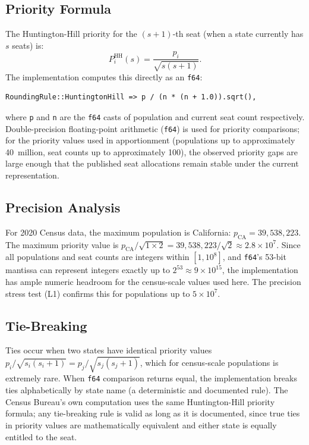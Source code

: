 \label{sec:huntington-hill}

\subsection{Priority Formula}

The Huntington-Hill priority for the $(s+1)$-th seat (when a state
currently has $s$ seats) is:
\[
  P_i^{\text{HH}}(s) = \frac{p_i}{\sqrt{s(s+1)}}.
\]
The implementation computes this directly as an \texttt{f64}:

\begin{verbatim}
RoundingRule::HuntingtonHill => p / (n * (n + 1.0)).sqrt(),
\end{verbatim}

where \texttt{p} and \texttt{n} are the \texttt{f64} casts of population
and current seat count respectively.
Double-precision floating-point arithmetic (\texttt{f64}) is used for
priority comparisons; for the priority values used in apportionment
(populations up to approximately 40~million, seat counts up to
approximately 100), the observed priority gaps are large enough that the
published seat allocations remain stable under the current representation.

\subsection{Precision Analysis}

For 2020 Census data, the maximum population is California:
$p_{\text{CA}} = 39{,}538{,}223$.
The maximum priority value is $p_{\text{CA}} / \sqrt{1 \times 2}
= 39{,}538{,}223 / \sqrt{2} \approx 2.8 \times 10^7$.
Since all populations and seat counts are integers within $[1, 10^8]$,
and \texttt{f64}'s 53-bit mantissa can represent integers exactly up to
$2^{53} \approx 9 \times 10^{15}$, the implementation has ample numeric
headroom for the census-scale values used here.
The precision stress test (L1) confirms this for populations up to
$5 \times 10^7$.

\subsection{Tie-Breaking}

Ties occur when two states have identical priority values $p_i / \sqrt{s_i(s_i+1)}
= p_j / \sqrt{s_j(s_j+1)}$, which for census-scale populations is
extremely rare.
When \texttt{f64} comparison returns equal, the implementation breaks
ties alphabetically by state name (a deterministic and documented rule).
The Census Bureau's own computation uses the same Huntington-Hill
priority formula; any tie-breaking rule is valid as long as it
is documented, since true ties in priority values are mathematically
equivalent and either state is equally entitled to the seat.

